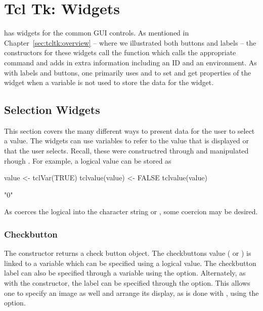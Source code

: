 \chapter{Tcl Tk: Widgets}
\label{sec:tcltk:widgets}

\Tk\/ has widgets for the common GUI controls. As mentioned in
Chapter~\ref{sec:tcltk:overview} -- where we illustrated both buttons
and labels -- the constructors for these widgets call the function
 which calls the appropriate \TK\/ command and adds
in extra information including an ID and an environment. As with
labels and buttons, one primarily uses  and
 to set and get properties of the widget when a
\TCL\/ variable is not used to store the data for the widget.




\section{Selection Widgets}
\label{sec:tcltk:selection-widgets}

This section covers the many different ways to present data for the
user to select a value. The widgets can use \TCL\/ variables to refer
to the value that is displayed or that the user selects.  Recall,
these were constructred through  and manipulated
rhough .  For example, a logical value can be stored as
\begin{Schunk}
\begin{Sinput}
 value <- tclVar(TRUE)
 tclvalue(value) <- FALSE
 tclvalue(value)
\end{Sinput}
\begin{Soutput}
[1] "0"
\end{Soutput}
\end{Schunk}
As  coerces the logical into the  character string   or , some coercion may be desired.

\subsection{Checkbutton}
\label{sec:tcltk:checkboxes}

The  constructor returns a check button
object. The checkbuttons value ( or ) is linked
to a \TCL\/ variable which can be specified using a logical value.
The checkbutton label can also be specified through a \TCL\/ variable
using the  option.  Alternately,
as with the  constructor, the label can be specified
through the  option. This allows one to
specify an image as well and arrange its display, as is done with
, using the 
option.


